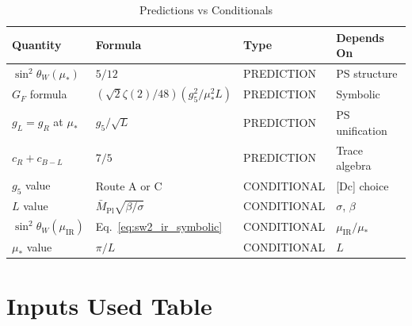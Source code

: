 \documentclass[11pt,a4paper]{article}
\theoremstyle{definition}
\begin{document}
\begin{table}[h]
\centering
\caption{Predictions vs Conditionals}
\label{tab:predictions}
\begin{tabular}{@{}llll@{}}
\toprule
\textbf{Quantity} & \textbf{Formula} & \textbf{Type} & \textbf{Depends On} \\
\midrule
$\sin^2\theta_W(\mu_*)$ & $5/12$ & PREDICTION & PS structure \\
$G_F$ formula & $(\sqrt{2}\zeta(2)/48)(g_5^2/\mu_*^2 L)$ & PREDICTION & Symbolic \\
$g_L = g_R$ at $\mu_*$ & $g_5/\sqrt{L}$ & PREDICTION & PS unification \\
$c_R + c_{B-L}$ & $7/5$ & PREDICTION & Trace algebra \\
$g_5$ value & Route A or C & CONDITIONAL & [Dc] choice \\
$L$ value & $\bar{M}_{\text{Pl}}\sqrt{\beta/\sigma}$ & CONDITIONAL & $\sigma$, $\beta$ \\
$\sin^2\theta_W(\mu_{\text{IR}})$ & Eq.~\ref{eq:sw2_ir_symbolic} & CONDITIONAL & $\mu_{\text{IR}}/\mu_*$ \\
$\mu_*$ value & $\pi/L$ & CONDITIONAL & $L$ \\
\bottomrule
\end{tabular}
\end{table}

\appendix
\section{Inputs Used Table}
\label{app:inputs}
\end{document}
